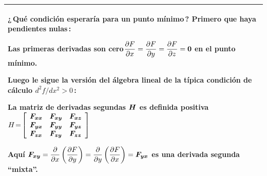 \documentclass[12pt,a4paper]{article}
\newcommand{\bi}[1]{\hbox{\boldmath$#1$}}
\newcommand\1{\mbox{\,\vrule height-0.8pt depth1.0pt width2pc\,}}
\newcommand\2{\mbox{\,\vrule height-0.8pt depth1.0pt width1pc\,}}
\begin{document}
\begin{enumerate}
\begin{tabular}{|@{\;}p{14.8cm}@{\;}|}
\vspace{-5pt}
¿\,Qué condición esperaría para un punto mínimo\,?\;  Primero que haya pendientes nulas\,:

\vspace{2pt}
\textbf{Las primeras derivadas son cero}\quad $\dfrac{\partial F}{\partial x}=\dfrac{\partial F}{\partial y}=\dfrac{\partial F}{\partial z}=\bi{0}$ en el punto mínimo.

Luego le sigue la versión del álgebra lineal de la típica condición de cálculo $d^2f/dx^2>0$\,:

\textbf{La matriz de derivadas segundas $\bi{H}$ es definida positiva}\quad $H\!=\!\left[\begin{array}{@{\;\,}lll@{\;\,}} \bi{F_{xx}}&\bi{F_{xy}}&\bi{F_{xz}}\\\bi{F_{yx}}&\bi{F_{yy}}&\bi{F_{yz}}\\\bi{F_{zx}}&\bi{F_{zy}}&\bi{F_{zz}}\\
\end{array}
\right]$

Aquí $\bi{F_{xy}}=\dfrac{\partial}{\partial x}\left(\dfrac{\partial F}{\partial y}\right)=\dfrac{\partial}{\partial y}\left(\dfrac{\partial F}{\partial x}\right)=\bi{F_{yx}}$ es una derivada segunda ``mixta''.
\\[15pt]\hline
\end{tabular}

\end{enumerate}
\end{document}
